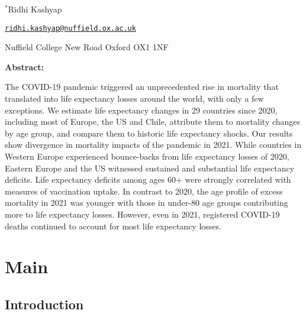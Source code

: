 \documentclass[12pt]{article}
\begin{document}
\begin{titlepage}
{\vspace{1em}

$^{*}$Ridhi Kashyap

\href{mailto:ridhi.kashyap@nuffield.ox.ac.uk}{\texttt{ridhi.kashyap@nuffield.ox.ac.uk}}

Nuffield College
New Road
Oxford OX1 1NF

\par\medskip}


\clearpage

{\textbf{Abstract:}\par

The COVID-19 pandemic triggered an unprecedented rise in mortality that translated into life expectancy losses around the world, with only a few exceptions. We estimate life expectancy changes in 29 countries since 2020, including most of Europe, the US and Chile, attribute them to mortality changes by age group, and compare them to historic life expectancy shocks. Our results show divergence in mortality impacts of the pandemic in 2021. While countries in Western Europe experienced bounce-backs from life expectancy losses of 2020, Eastern Europe and the US witnessed sustained and substantial life expectancy deficits. Life expectancy deficits among ages 60+ were strongly correlated with measures of vaccination uptake. In contrast to 2020, the age profile of excess mortality in 2021 was younger with those in under-80 age groups contributing more to life expectancy losses. However, even in 2021, registered COVID-19 deaths continued to account for most life expectancy losses.

\par\medskip}

\clearpage

\end{titlepage}


\section*{Main}

\subsection*{Introduction}
\end{document}

